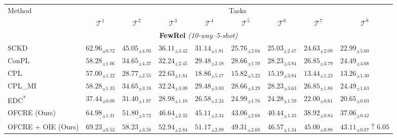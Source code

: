 \begin{table*}[ht]
\centering
\begin{adjustbox}{width=\textwidth}
\begin{tabular}{lllllllll}
\toprule
\multirow{2}{*}{Method} & \multicolumn{8}{c}{Tasks} \\
\cmidrule{2-9}
& \multicolumn{1}{c}{$\mathcal{T}^1$} & \multicolumn{1}{c}{$\mathcal{T}^2$} & \multicolumn{1}{c}{$\mathcal{T}^3$} & \multicolumn{1}{c}{$\mathcal{T}^4$} & \multicolumn{1}{c}{$\mathcal{T}^5$} & \multicolumn{1}{c}{$\mathcal{T}^6$} & \multicolumn{1}{c}{$\mathcal{T}^7$} & \multicolumn{1}{c}{$\mathcal{T}^8$}  \\ 
\toprule
\multicolumn{9}{c}{\textbf{FewRel} \textit{(10-way--5-shot)}} \\
\midrule
SCKD      & $62.96_{\pm 0.72}$ & $45.05_{\pm 4.93}$ & $36.11_{\pm 3.42}$ & $31.14_{\pm 1.81}$ & $25.76_{\pm 2.04}$ & $25.03_{\pm 2.47}$ & $24.63_{\pm 2.09}$ & $22.99_{\pm 5.60}$ \\ 
ConPL & ${58.28_{\pm 1.06}}$ & $34.65_{\pm 4.37}$ & $32.24_{\pm 2.45}$ & $29.48_{\pm 2.18}$ & $28.66_{\pm 1.70}$ & $28.23_{\pm 3.84}$ & $26.85_{\pm 3.79}$ & $24.49_{\pm 4.68}$ \\
CPL & {$57.00_{\pm 1.22}$} & $28.77_{\pm 2.55}$ & $22.63_{\pm 1.84}$ & $18.86_{\pm 5.17}$ & $15.82_{\pm 5.22}$ & $15.19_{\pm 3.84}$ & $13.44_{\pm 1.23}$ & $13.26_{\pm 1.30}$ \\
CPL\_MI & $58.28_{\pm 1.33}$ & {$34.65_{\pm 3.18}$} & {$32.24_{\pm 3.09}$} & {$29.48_{\pm 3.03}$} & {$28.66_{\pm 3.29}$} & {$28.23_{\pm 3.63}$} & {$26.85_{\pm 1.88}$} & {$24.49_{\pm 1.63}$} \\
EDC\textsuperscript{*} & $37.44_{\pm 0.08}$ & {$31.40_{\pm 1.87}$} & {$28.98_{\pm 1.10}$} & {$26.58_{\pm 2.24}$} & {$24.99_{\pm 1.76}$} & {$24.28_{\pm 1.59}$} & {$22.00_{\pm 0.61}$} & {$20.65_{\pm 0.03}$} \\
OFCRE (Ours) & $\underline{64.98_{\pm 1.31}}$ & $\underline{51.80_{\pm 3.72}}$ & $\underline{46.64_{\pm 2.32}}$ & $\underline{45.11_{\pm 2.34}}$ & $\underline{43.06_{\pm 2.68}}$ & $\underline{40.44_{\pm 1.33}}$ & $\underline{38.92_{\pm 0.84}}$ & $\underline{37.06_{\pm 0.42}}$ \\
OFCRE + OIE (Ours) & $\mathbf{69.23_{\pm 0.53}}$ & $\mathbf{58.23_{\pm 3.58}}$ & $\mathbf{52.94_{\pm 2.84}}$ & $\mathbf{51.17_{\pm 2.89}}$ & $\mathbf{49.31_{\pm 2.68}}$ & $\mathbf{46.57_{\pm 1.34}}$ & $\mathbf{45.00_{\pm 0.88}}$ & $\mathbf{43.11_{\pm 0.87}}${\color{darkgreen}\footnotesize $\uparrow{6.05}$} \\


\end{tabular}
\end{adjustbox}
\end{table*}
